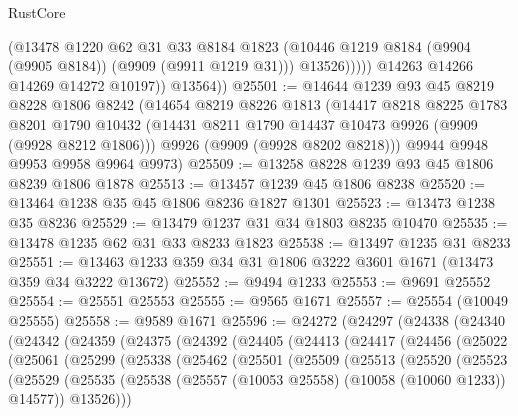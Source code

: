 \begin{lexlean}{RustCore}
\begin{coremodule}
                    (@13478
                      @1220
                      @62
                      @31
                      @33
                      @8184
                      @1823
                      (@10446 @1219 @8184 (@9904 (@9905 @8184)) (@9909 (@9911 @1219 @31)))
                      @13526)))))
            @14263
            @14266
            @14269
            @14272
            @10197))
        @13564))
@25501 := @14644
    @1239
    @93
    @45
    @8219
    @8228
    @1806
    @8242
    (@14654
      @8219
      @8226
      @1813
      (@14417
        @8218
        @8225
        @1783
        @8201
        @1790
        @10432
        (@14431 @8211 @1790 @14437 @10473 @9926 (@9909 (@9928 @8212 @1806)))
        @9926
        (@9909 (@9928 @8202 @8218)))
      @9944
      @9948
      @9953
      @9958
      @9964
      @9973)
@25509 := @13258 @8228 @1239 @93 @45 @1806 @8239 @1806 @1878
@25513 := @13457 @1239 @45 @1806 @8238
@25520 := @13464 @1238 @35 @45 @1806 @8236 @1827 @1301
@25523 := @13473 @1238 @35 @8236
@25529 := @13479 @1237 @31 @34 @1803 @8235 @10470
@25535 := @13478 @1235 @62 @31 @33 @8233 @1823
@25538 := @13497 @1235 @31 @8233
@25551 := @13463 @1233 @359 @34 @31 @1806 @3222 @3601 @1671 (@13473 @359 @34 @3222 @13672)
@25552 := @9494 @1233
@25553 := @9691 @25552
@25554 := @25551 @25553
@25555 := @9565 @1671
@25557 := @25554 (@10049 @25555)
@25558 := @9589 @1671
@25596 := @24272
    (@24297
      (@24338
        (@24340
          (@24342
            (@24359
              (@24375
                (@24392
                  (@24405
                    (@24413
                      (@24417
                        (@24456
                          (@25022
                            (@25061
                              (@25299
                                (@25338
                                  (@25462
                                    (@25501
                                      (@25509
                                        (@25513
                                          (@25520
                                            (@25523
                                              (@25529
                                                (@25535
                                                  (@25538
                                                    (@25557
                                                      (@10053 @25558)
                                                      (@10058 (@10060 @1233))
                                                      @14577))
                                                  @13526)))

\end{coremodule}
\end{lexlean}
